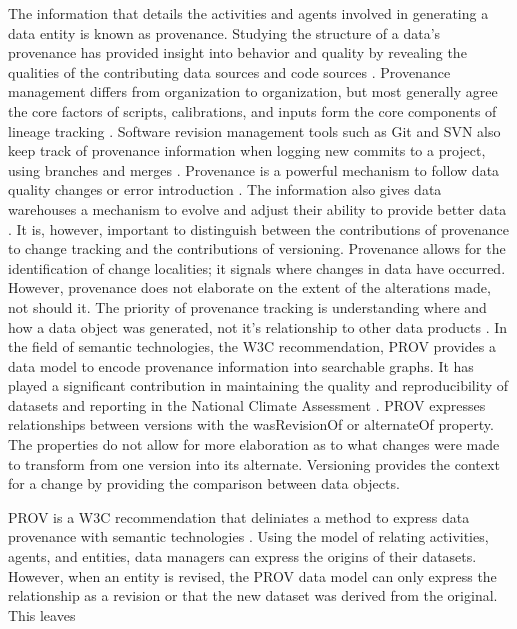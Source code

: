 The information that details the activities and agents involved in generating a data entity is known as provenance.
Studying the structure of a data's provenance has provided insight into behavior and quality by revealing the qualities of the contributing data sources and code sources \cite{dai2014provenance} \cite{Cavanaugh2002}.
Provenance management differs from organization to organization, but most generally agree the core factors of scripts, calibrations, and inputs form the core components of lineage tracking \cite{Barkstrom2003} \cite{Branco2008}.
Software revision management tools such as Git and SVN also keep track of provenance information when logging new commits to a project, using branches and merges  \cite{Chacon:2009:PG:1618548}.
Provenance is a powerful mechanism to follow data quality changes or error introduction .
The information also gives data warehouses a mechanism to evolve and adjust their ability to provide better data \cite{Vassiliadis1999}.
It is, however, important to distinguish between the contributions of provenance to change tracking and the contributions of versioning.
Provenance allows for the identification of change localities; it signals where changes in data have occurred.
However, provenance does not elaborate on the extent of the alterations made, not should it.
The priority of provenance tracking is understanding where and how a data object was generated, not it's relationship to other data products \cite{Bose:2005:LRS:1057977.1057978}.
In the field of semantic technologies, the W3C recommendation, PROV provides a data model to encode provenance information into searchable graphs.
It has played a significant contribution in maintaining the quality and reproducibility of datasets and reporting in the National Climate Assessment \cite{Tilmes2012,Ma2014191,Ma2014}.
PROV expresses relationships between versions with the wasRevisionOf or alternateOf property.
The properties do not allow for more elaboration as to what changes were made to transform from one version into its alternate.
Versioning provides the context for a change by providing the comparison between data objects.

PROV is a W3C recommendation that deliniates a method to express data provenance with semantic technologies \cite{Belhajjame2013}.
Using the model of relating activities, agents, and entities, data managers can express the origins of their datasets.
However, when an entity is revised, the PROV data model can only express the relationship as a revision or that the new dataset was derived from the original.
This leaves

